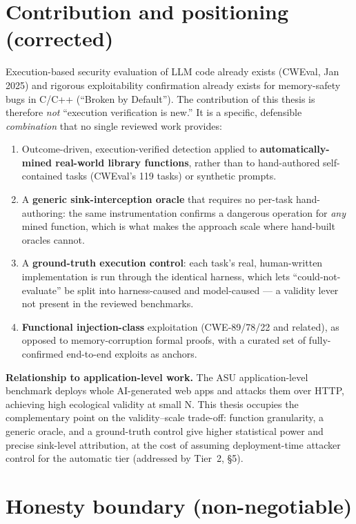 \documentclass[11pt]{article}
\begin{document}
\section{Contribution and positioning (corrected)}

Execution-based security evaluation of LLM code already exists (CWEval, Jan
2025) and rigorous exploitability confirmation already exists for
memory-safety bugs in C/C++ (``Broken by Default''). The contribution of
this thesis is therefore \emph{not} ``execution verification is new.'' It is
a specific, defensible \emph{combination} that no single reviewed work
provides:

\begin{enumerate}[leftmargin=1.6em,itemsep=1pt,topsep=2pt]
  \item Outcome-driven, execution-verified detection applied to
  \textbf{automatically-mined real-world library functions}, rather than to
  hand-authored self-contained tasks (CWEval's 119 tasks) or synthetic
  prompts.
  \item A \textbf{generic sink-interception oracle} that requires no
  per-task hand-authoring: the same instrumentation confirms a dangerous
  operation for \emph{any} mined function, which is what makes the approach
  scale where hand-built oracles cannot.
  \item A \textbf{ground-truth execution control}: each task's real,
  human-written implementation is run through the identical harness, which
  lets ``could-not-evaluate'' be split into harness-caused and model-caused
  --- a validity lever not present in the reviewed benchmarks.
  \item \textbf{Functional injection-class} exploitation (CWE-89/78/22 and
  related), as opposed to memory-corruption formal proofs, with a curated
  set of fully-confirmed end-to-end exploits as anchors.
\end{enumerate}

\textbf{Relationship to application-level work.} The ASU application-level
benchmark deploys whole AI-generated web apps and attacks them over HTTP,
achieving high ecological validity at small N. This thesis occupies the
complementary point on the validity--scale trade-off: function granularity,
a generic oracle, and a ground-truth control give higher statistical power
and precise sink-level attribution, at the cost of assuming deployment-time
attacker control for the automatic tier (addressed by Tier~2, \S5).

\section{Honesty boundary (non-negotiable)}
\end{document}
